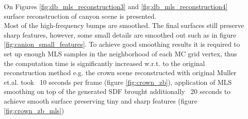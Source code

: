 On Figures \ref{fig:db_mls_reconstruction3} and \ref{fig:db_mls_reconstruction4} surface reconstruction of canyon scene is presented.\\
Most of the high-frequency bumps are smoothed. The final surfaces still preserve sharp features, however, some small details are smoothed out such as in figure \ref{fig:canion_small_features}. To achieve good smoothing results it is required to set up enough MLS samples in the neighborhood of each MC grid vertex, thus the computation time is significantly increased w.r.t. to the original reconstruction method e.g. the crown scene reconstructed with original Muller et.al. took ~10 seconds per frame (figure \ref{fig:crown_zb}), application of MLS smoothing on top of the generated SDF brought additionally ~20 seconds to achieve smooth surface preserving tiny and sharp features (figure \ref{fig:crown_zb_mls}) 

